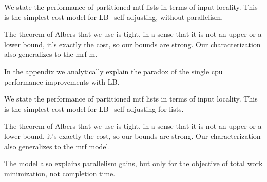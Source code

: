 We state the performance of partitioned mtf lists in terms of input locality. This is the simplest cost model for LB+self-adjusting, without parallelism.

The theorem of Albers that we use is tight, in a sense that it is not an upper or a lower bound, it's exactly the cost, so our bounds are strong. Our characterization also generalizes to the mrf m.








In the appendix we analytically explain the paradox of the single cpu performance improvements with LB.

We state the performance of partitioned mtf lists in terms of input locality. This is the simplest cost model for LB+self-adjusting for lists.

The theorem of Albers that we use is tight, in a sense that it is not an upper or a lower bound, it's exactly the cost, so our bounds are strong. Our characterization also generalizes to the mrf model.

The model also explains parallelism gains, but only for the objective of total work minimization, not completion time.